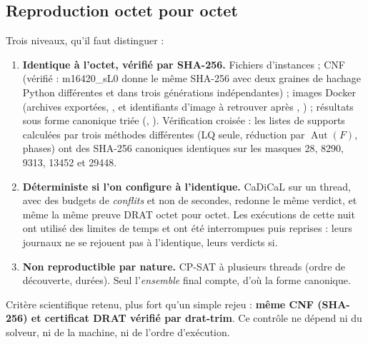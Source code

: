 \subsection{Reproduction octet pour octet}
{\sloppy
Trois niveaux, qu'il faut distinguer :
\begin{enumerate}[nosep]
\item \textbf{Identique à l'octet, vérifié par SHA-256.} Fichiers d'instances ; CNF (vérifié : m16420\_sL0 donne le même SHA-256
 avec deux graines de hachage Python différentes et dans trois générations indépendantes) ; images Docker (archives
exportées, , et identifiants d'image à retrouver après , ) ; résultats sous
forme canonique triée (, ). Vérification croisée : les listes de supports calculées par trois méthodes
différentes (LQ seule, réduction par $\operatorname{Aut}(F)$, phases) ont des SHA-256 canoniques identiques sur les masques 28, 8290, 9313, 13452
et 29448.
\item \textbf{Déterministe si l'on configure à l'identique.} CaDiCaL sur un thread, avec des budgets de \emph{conflits} et non de secondes, redonne
le même verdict, et même la même preuve DRAT octet pour octet. Les exécutions de cette nuit ont utilisé des limites de temps et ont été
interrompues puis reprises : leurs journaux ne se rejouent pas à l'identique, leurs verdicts si.
\item \textbf{Non reproductible par nature.} CP-SAT à plusieurs threads (ordre de découverte, durées). Seul l'\emph{ensemble} final compte, d'où
la forme canonique.
\end{enumerate}
Critère scientifique retenu, plus fort qu'un simple rejeu : \textbf{même CNF (SHA-256) et certificat DRAT vérifié par drat-trim}. Ce contrôle ne
dépend ni du solveur, ni de la machine, ni de l'ordre d'exécution.\par}

